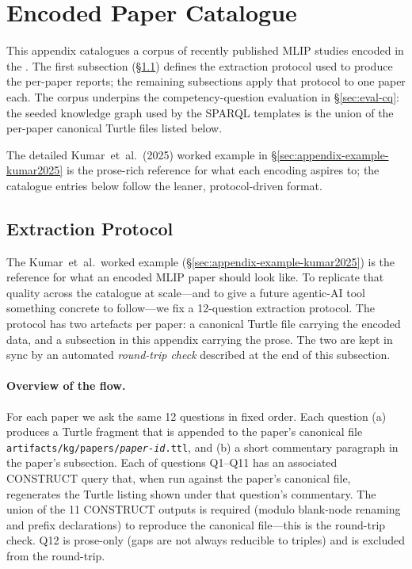 \section{Encoded Paper Catalogue}
\label{sec:appendix-paper-catalogue}

This appendix catalogues a corpus of recently published MLIP studies
encoded in the \MLIPsOntology{}. The first subsection
(\S\ref{sec:appendix-example-protocol}) defines the extraction
protocol used to produce the per-paper reports; the remaining
subsections apply that protocol to one paper each. The corpus
underpins the competency-question evaluation in
\S\ref{sec:eval-cq}: the seeded knowledge graph used by the SPARQL
templates is the union of the per-paper canonical Turtle files
listed below.

The detailed Kumar~et~al.\ (2025) worked example in
\S\ref{sec:appendix-example-kumar2025} is the prose-rich reference
for what each encoding aspires to; the catalogue entries below
follow the leaner, protocol-driven format.

\subsection{Extraction Protocol}
\label{sec:appendix-example-protocol}

The Kumar~et~al.\ worked example
(\S\ref{sec:appendix-example-kumar2025}) is the reference for what
an encoded MLIP paper should look like. To replicate that quality
across the catalogue at scale---and to give a future agentic-AI
tool something concrete to follow---we fix a 12-question extraction
protocol. The protocol has two artefacts per paper: a canonical
Turtle file carrying the encoded data, and a subsection in this
appendix carrying the prose. The two are kept in sync by an
automated \emph{round-trip check} described at the end of this
subsection.

\paragraph{Overview of the flow.}
For each paper we ask the same 12 questions in fixed order. Each
question (a) produces a Turtle fragment that is appended to the
paper's canonical file
\texttt{artifacts/kg/papers/\textit{paper-id}.ttl}, and (b) a short
commentary paragraph in the paper's subsection. Each of questions
Q1--Q11 has an associated CONSTRUCT query that, when run against the
paper's canonical file, regenerates the Turtle listing shown under
that question's commentary. The union of the 11 CONSTRUCT outputs is
required (modulo blank-node renaming and prefix declarations) to
reproduce the canonical file---this is the round-trip check. Q12 is
prose-only (gaps are not always reducible to triples) and is excluded
from the round-trip.

